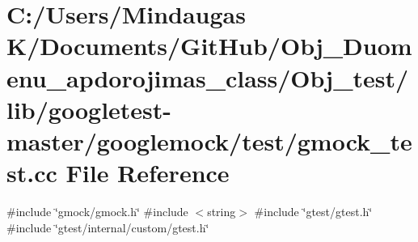 \hypertarget{_obj__test_2lib_2googletest-master_2googlemock_2test_2gmock__test_8cc}{}\section{C\+:/\+Users/\+Mindaugas K/\+Documents/\+Git\+Hub/\+Obj\+\_\+\+Duomenu\+\_\+apdorojimas\+\_\+class/\+Obj\+\_\+test/lib/googletest-\/master/googlemock/test/gmock\+\_\+test.cc File Reference}
\label{_obj__test_2lib_2googletest-master_2googlemock_2test_2gmock__test_8cc}
{\ttfamily \#include \char`\"{}gmock/gmock.\+h\char`\"{}}\newline
{\ttfamily \#include $<$string$>$}\newline
{\ttfamily \#include \char`\"{}gtest/gtest.\+h\char`\"{}}\newline
{\ttfamily \#include \char`\"{}gtest/internal/custom/gtest.\+h\char`\"{}}\newline

